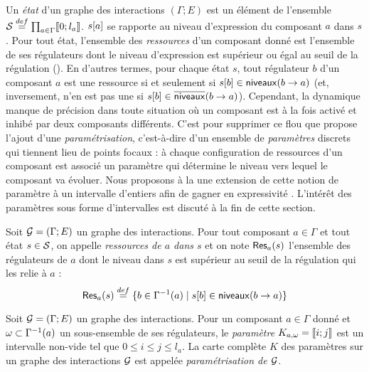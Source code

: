 Un \emph{état} d'un graphe des interactions $(\Gamma; E)$ est un élément de l'ensemble
$\mathcal{S} \stackrel{def}= \prod_{a \in \Gamma} \mathopen{\llbracket}0\mathclose{};l_a\mathclose{\rrbracket}$.
${s[a]}$ se rapporte au niveau d'expression du composant $a$ dans $s$.
Pour tout état, l'ensemble des \emph{ressources} d'un composant donné est
l'ensemble de ses régulateurs dont le niveau d'expression est supérieur ou égal au seuil
de la régulation ().
En d'autres termes, pour chaque état $s$, tout régulateur $b$ d'un composant $a$
est une ressource si et seulement si ${s[b]} \in \mathsf{niveaux}(b\rightarrow a)$
(et, inversement, n'en est pas une si ${s[b]} \in \overline{\mathsf{niveaux}}(b\rightarrow a)$).
Cependant, la dynamique manque de précision dans toute situation où un
composant est à la fois activé et inhibé par deux composants différents.
C'est pour supprimer ce flou que  propose l'ajout d'une
\emph{paramétrisation},
c'est-à-dire d'un ensemble de \emph{paramètres} discrets
qui tiennent lieu de points focaux :
à chaque configuration de ressources d'un composant est associé un paramètre
qui détermine le niveau vers lequel le composant va évoluer.
Nous proposons à la  une extension de cette notion de paramètre
à un intervalle d'entiers afin de gagner en expressivité
\cite{FPIMR12-CMSB}.
L'intérêt des paramètres sous forme d'intervalles est discuté à la fin de cette section.

\begin{definition}
  Soit $\mathcal{G} = (\Gamma; E)$ un graphe des interactions.
  Pour tout composant $a \in \Gamma$ et tout état $s \in \mathcal{S}$,
  on appelle \emph{ressources de $a$ dans $s$} et on note $\mathsf{Res}_{a}(s)$
  l'ensemble des régulateurs de $a$ dont le niveau dans $s$ est supérieur au seuil
  de la régulation qui les relie à $a$ :
    \[\mathsf{Res}_{a}(s) \stackrel{def}= \{ b \in \Gamma^{-1}(a) \mid {s[b]} \in \mathsf{niveaux}(b\rightarrow a) \}\]
\end{definition}

\begin{definition}
  Soit $\mathcal{G} = (\Gamma; E)$ un graphe des interactions.
  Pour un composant $a \in \Gamma$ donné
  et $\omega \subset \Gamma^{-1}(a)$ un sous-ensemble de ses régulateurs,
  le \emph{paramètre} $K_{a,\omega} = \mathopen{\llbracket}i\mathclose{};j\mathclose{\rrbracket}$ est un intervalle non-vide tel que
  $0 \leq i \leq j \leq l_a$.
  La carte complète $K$ des paramètres sur un graphe des interactions $\mathcal{G}$
  est appelée \emph{paramétrisation de $\mathcal{G}$}.
\end{definition}

